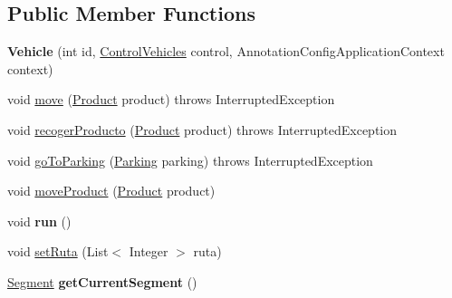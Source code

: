 \subsection*{Public Member Functions}
\begin{DoxyCompactItemize}
\item 
\mbox{\label{classmondragon_1_1edu_1_1clases_1_1_vehicle_a8861c02168a1841cf3f081982f314797}} 
{\bfseries Vehicle} (int id, \mbox{\hyperlink{classmondragon_1_1edu_1_1control_1_1_control_vehicles}{Control\+Vehicles}} control, Annotation\+Config\+Application\+Context context)
\item 
void \mbox{\hyperlink{classmondragon_1_1edu_1_1clases_1_1_vehicle_a70ac1c7c2a0cc9e5bfe1ccd0b2e89ed5}{move}} (\mbox{\hyperlink{classmondragon_1_1edu_1_1clases_1_1_product}{Product}} product)  throws Interrupted\+Exception 
\item 
void \mbox{\hyperlink{classmondragon_1_1edu_1_1clases_1_1_vehicle_aa8c62e43372fe2ea461933e68f69ab2b}{recoger\+Producto}} (\mbox{\hyperlink{classmondragon_1_1edu_1_1clases_1_1_product}{Product}} product)  throws Interrupted\+Exception 
\item 
void \mbox{\hyperlink{classmondragon_1_1edu_1_1clases_1_1_vehicle_a25806b71f37b2004f3209d4b63a432ce}{go\+To\+Parking}} (\mbox{\hyperlink{classmondragon_1_1edu_1_1clases_1_1_parking}{Parking}} parking)  throws Interrupted\+Exception 
\item 
void \mbox{\hyperlink{classmondragon_1_1edu_1_1clases_1_1_vehicle_a9848250e8a7bbf1dadf63262cae2ddac}{move\+Product}} (\mbox{\hyperlink{classmondragon_1_1edu_1_1clases_1_1_product}{Product}} product)
\item 
\mbox{\label{classmondragon_1_1edu_1_1clases_1_1_vehicle_afc2d766410d06ed25910f6abc68228d6}} 
void {\bfseries run} ()
\item 
void \mbox{\hyperlink{classmondragon_1_1edu_1_1clases_1_1_vehicle_a59e0fe87a465b6640295a76d3745a440}{set\+Ruta}} (List$<$ Integer $>$ ruta)
\item 
\mbox{\label{classmondragon_1_1edu_1_1clases_1_1_vehicle_a3a7eaa0f779b633e7aa78a6f8a6e1e73}} 
\mbox{\hyperlink{classmondragon_1_1edu_1_1clases_1_1_segment}{Segment}} {\bfseries get\+Current\+Segment} ()
\item 
\mbox{\label{classmondragon_1_1edu_1_1clases_1_1_vehicle_af7713604bcb13e120de8f8e69ed66496}} 

\end{DoxyCompactItemize}
